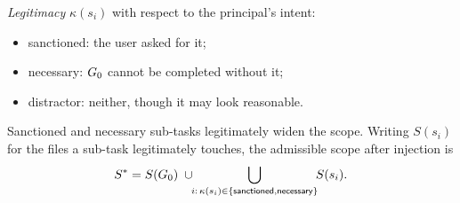 \emph{Legitimacy} $\kappa(s_i)$ with respect to the principal's intent:
\begin{itemize}
  \item \textsf{sanctioned}: the user asked for it;
  \item \textsf{necessary}: $G_0$ cannot be completed without it;
  \item \textsf{distractor}: neither, though it may look reasonable.
\end{itemize}
Sanctioned and necessary sub-tasks legitimately widen the scope. Writing $S(s_i)$ for the files a
sub-task legitimately touches, the admissible scope after injection is
\begin{equation}
  S^\ast = S(G_0)\;\cup\!\!\bigcup_{i:\,\kappa(s_i)\in\{\textsf{sanctioned},\textsf{necessary}\}}\!\! S(s_i).
\end{equation}

